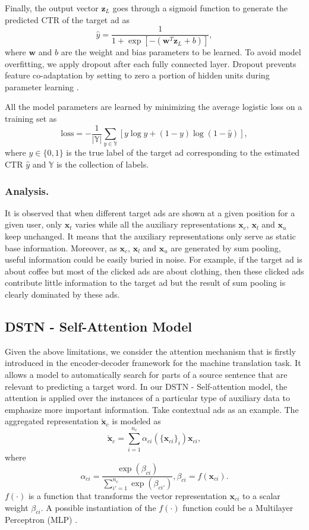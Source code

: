 \documentclass[sigconf]{acmart}
\begin{document}
Finally, the output vector $\mathbf{z}_L$ goes through a sigmoid function to generate the predicted CTR of the target ad as
\[
\hat{y} = \frac{1}{1+\exp[- (\mathbf{w}^T \mathbf{z}_L + b)]},
\]
where $\mathbf{w}$ and $b$ are the weight and bias parameters to be learned.
To avoid model overfitting, we apply dropout \cite{srivastava2014dropout} after each fully connected layer. Dropout prevents feature co-adaptation by setting to zero a portion of hidden units during parameter learning \cite{goodfellow2013maxout}.

All the model parameters are learned by minimizing the average logistic loss on a training set as
\begin{equation} \label{loss}
\mathrm{loss} = - \frac{1}{|\mathbb{Y}|}\sum_{y \in \mathbb{Y}} [y \log \hat{y} + (1 - y) \log (1 - \hat{y})],
\end{equation}
where $y \in\{0,1\}$ is the true label of the target ad corresponding to the estimated CTR $\hat{y}$ and $\mathbb{Y}$ is the collection of labels.

\subsubsection{Analysis.}
It is observed that when different target ads are shown at a given position for a given user, only $\mathbf{x}_t$ varies while all the auxiliary representations $\mathbf{x}_c$, $\mathbf{x}_l$ and $\mathbf{x}_u$ keep unchanged. It means that the auxiliary representations only serve as static base information.
Moreover, as $\mathbf{x}_c$, $\mathbf{x}_l$ and $\mathbf{x}_u$ are generated by sum pooling, useful information could be easily buried in noise. For example, if the target ad is about coffee but most of the clicked ads are about clothing, then these clicked ads contribute little information to the target ad but the result of sum pooling is clearly dominated by these ads.

\subsection{DSTN - Self-Attention Model} \label{sec_att}
Given the above limitations, we consider the attention mechanism \cite{bahdanau2014neural} that is firstly introduced in the encoder-decoder framework for the machine translation task. It allows a model to automatically search for parts of a source sentence that are relevant to predicting a target word.
In our DSTN - Self-attention model, the attention is applied over the instances of a particular type of auxiliary data to emphasize more important information. Take contextual ads as an example. The aggregated representation $\check{\mathbf{x}}_c$ is modeled as
\begin{equation} \label{att}
\check{\mathbf{x}}_c = \sum_{i=1}^{n_c} \alpha_{ci}(\{\mathbf{x}_{ci}\}_i) \mathbf{x}_{ci},
\end{equation}
where
\[
\alpha_{ci} = \frac{\exp(\beta_{ci})}{\sum_{i'=1}^{n_c} \exp(\beta_{ci'})}, \beta_{ci} = f(\mathbf{x}_{ci}).
\]
$f(\cdot)$ is a function that transforms the vector representation $\mathbf{x}_{ci}$ to a scalar weight $\beta_{ci}$. A possible instantiation of the $f(\cdot)$ function could be a Multilayer Perceptron (MLP) \cite{bahdanau2014neural}.
\end{document}
